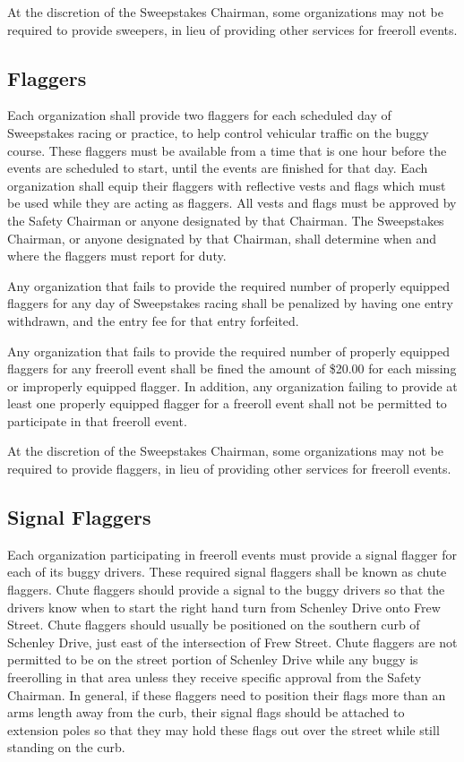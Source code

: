 	At the discretion of the Sweepstakes Chairman, some organizations may not be
	required to provide sweepers, in lieu of providing other services for freeroll
	events.
	
\subsection{Flaggers}

	Each organization shall provide two flaggers for each scheduled day of
	Sweepstakes racing or practice, to help control vehicular traffic on the buggy course.
	These flaggers must be available from a time that is one hour before the events
	are scheduled to start, until the events are finished for that day. Each
	organization shall equip their flaggers with reflective vests and flags which
	must be used while they are acting as flaggers. All vests and flags must be
	approved by the Safety Chairman or anyone designated by that Chairman. The
	Sweepstakes Chairman, or anyone designated by that Chairman, shall determine
	when and where the flaggers must report for duty.

	Any organization that fails to provide the required number of properly equipped
	flaggers for any day of Sweepstakes racing shall be penalized by having one
	entry withdrawn, and the entry fee for that entry forfeited.

	Any organization that fails to provide the required number of properly equipped
	flaggers for any freeroll event shall be fined the amount of \$20.00 for
	each missing or improperly equipped flagger. In addition, any organization
	failing to provide at least one properly equipped flagger for a freeroll
	event shall not be permitted to participate in that freeroll event.

	At the discretion of the Sweepstakes Chairman, some organizations may not be
	required to provide flaggers, in lieu of providing other services for freeroll
	events.
	
	
\subsection{Signal Flaggers}

	Each organization participating in freeroll events must provide a signal
	flagger for each of its buggy drivers. These required signal flaggers shall be
	known as chute flaggers. Chute flaggers should provide a signal to the buggy
	drivers so that the drivers know when to start the right hand turn from
	Schenley Drive onto Frew Street. Chute flaggers should usually be positioned on
	the southern curb of Schenley Drive, just east of the intersection of Frew
	Street. Chute flaggers are not permitted to be on the street portion of
	Schenley Drive while any buggy is freerolling in that area unless they receive
	specific approval from the Safety Chairman. In general, if these flaggers need
	to position their flags more than an arms length away from the curb, their
	signal flags should be attached to extension poles so that they may hold these
	flags out over the street while still standing on the curb.

